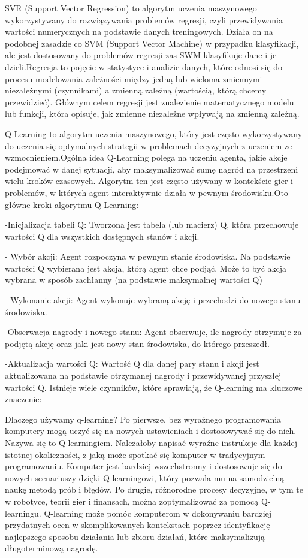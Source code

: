 SVR (Support Vector Regression) to algorytm uczenia maszynowego wykorzystywany do rozwiązywania problemów regresji, czyli przewidywania wartości numerycznych na podstawie danych treningowych. Działa on na podobnej zasadzie co SVM (Support Vector Machine) w przypadku klasyfikacji, ale jest dostosowany do problemów regresji zas SWM klasyfikuje dane i je dzieli.Regresja to pojęcie w statystyce i analizie danych, które odnosi się do procesu modelowania zależności między jedną lub wieloma zmiennymi niezależnymi (czynnikami) a zmienną zależną (wartością, którą chcemy przewidzieć). Głównym celem regresji jest znalezienie matematycznego modelu lub funkcji, która opisuje, jak zmienne niezależne wpływają na zmienną zależną.

Q-Learning to algorytm uczenia maszynowego, który jest często wykorzystywany do uczenia się optymalnych strategii w problemach decyzyjnych z uczeniem ze wzmocnieniem.Ogólna idea Q-Learning polega na uczeniu agenta, jakie akcje podejmować w danej sytuacji, aby maksymalizować sumę nagród na przestrzeni wielu kroków czasowych. Algorytm ten jest często używany w kontekście gier i problemów, w których agent interaktywnie działa w pewnym środowisku.Oto główne kroki algorytmu Q-Learning: 

-Inicjalizacja tabeli Q: Tworzona jest tabela (lub macierz) Q, która przechowuje wartości Q dla wszystkich dostępnych stanów i akcji.

- Wybór akcji: Agent rozpoczyna w pewnym stanie środowiska. Na podstawie wartości Q wybierana jest akcja, którą agent chce podjąć. Może to być akcja wybrana w sposób zachłanny (na podstawie maksymalnej wartości Q) 

- Wykonanie akcji: Agent wykonuje wybraną akcję i przechodzi do nowego stanu środowiska.

-Obserwacja nagrody i nowego stanu: Agent obserwuje, ile nagrody otrzymuje za podjętą akcję oraz jaki jest nowy stan środowiska, do którego przeszedł.

-Aktualizacja wartości Q: Wartość Q dla danej pary stanu i akcji jest aktualizowana na podstawie otrzymanej nagrody i przewidywanej przyszłej wartości Q. Istnieje wiele czynników, które sprawiają, że Q-learning ma kluczowe znaczenie:

Dlaczego używamy q-learning? Po pierwsze, bez wyraźnego programowania komputery mogą uczyć się na nowych ustawieniach i dostosowywać się do nich. Nazywa się to Q-learningiem. Należałoby napisać wyraźne instrukcje dla każdej istotnej okoliczności, z jaką może spotkać się komputer w tradycyjnym programowaniu. Komputer jest bardziej wszechstronny i dostosowuje się do nowych scenariuszy dzięki Q-learningowi, który pozwala mu na samodzielną naukę metodą prób i błędów.
Po drugie, różnorodne procesy decyzyjne, w tym te w robotyce, teorii gier i finansach, można zoptymalizować za pomocą Q-learningu. Q-learning może pomóc komputerom w dokonywaniu bardziej przydatnych ocen w skomplikowanych kontekstach poprzez identyfikację najlepszego sposobu działania lub zbioru działań, które maksymalizują długoterminową nagrodę.

